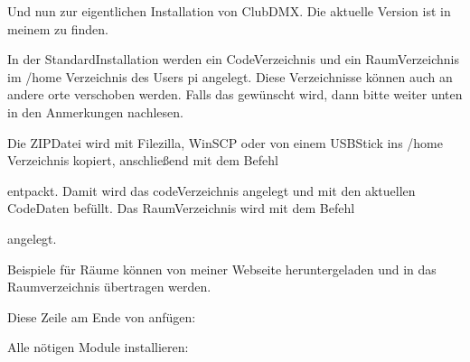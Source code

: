 \documentclass[letterpaper,10pt,ngerman]{sphinxmanual}
\begin{document}

Und nun zur eigentlichen Installation von ClubDMX. Die aktuelle Version ist
in meinem 
zu finden.


In der Standard\sphinxhyphen{}Installation werden ein Code\sphinxhyphen{}Verzeichnis und ein Raum\sphinxhyphen{}Verzeichnis
im /home Verzeichnis des Users pi angelegt. Diese Verzeichnisse können auch an
andere orte verschoben werden. Falls das gewünscht wird, dann bitte weiter unten
in den Anmerkungen nachlesen.

Die ZIP\sphinxhyphen{}Datei wird mit Filezilla, WinSCP oder von einem USB\sphinxhyphen{}Stick
ins /home Verzeichnis kopiert,  anschließend mit dem
Befehl


entpackt. Damit wird das code\sphinxhyphen{}Verzeichnis  
angelegt und mit den aktuellen
Code\sphinxhyphen{}Daten befüllt. Das Raum\sphinxhyphen{}Verzeichnis wird mit dem Befehl


angelegt.

Beispiele für Räume können von meiner Webseite
 heruntergeladen und in das Raumverzeichnis
übertragen werden.


Diese Zeile am Ende von  anfügen:



Alle nötigen Module installieren:

\begin{sphinxVerbatim}[commandchars=\\\{\}]
 
\end{sphinxVerbatim}

\end{document}
